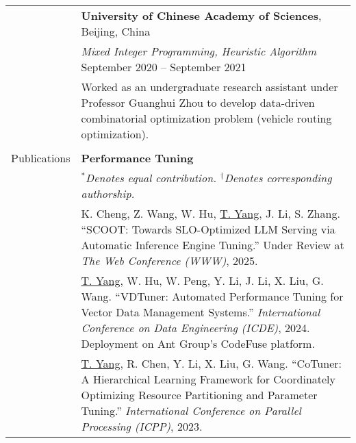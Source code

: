\documentclass[letterpaper, 10pt]{article}
\begin{document}
\begin{longtable}{p{}p{}}
& \textbf{University of Chinese Academy of Sciences}, Beijing, China \\ 
& \textit{Mixed Integer Programming, Heuristic Algorithm} \hfill September 2020 -- September 2021 \\
&  Worked as an undergraduate research assistant under Professor Guanghui Zhou to develop data-driven combinatorial optimization problem (vehicle routing optimization). \\
& \\




\nohyphens{\textcolor{OliveGreen}{Publications}} 
& \textbf{Performance Tuning} 
\vspace{0.01\textwidth} \\

& \textit{$^*$Denotes equal contribution. $^\dagger$Denotes corresponding authorship.} 
\vspace{0.01\textwidth} \\

& K. Cheng, Z. Wang, W. Hu, \underline{T. Yang}, J. Li, S. Zhang. \enquote{SCOOT: Towards SLO-Optimized LLM Serving via Automatic Inference Engine Tuning.} Under Review at  \textit{The Web Conference (WWW)}, 2025. 
\vspace{0.01\textwidth} \\

& \underline{T. Yang}, W. Hu, W. Peng, Y. Li, J. Li, X. Liu, G. Wang. \enquote{VDTuner: Automated Performance Tuning for Vector Data Management Systems.} \textit{International Conference on Data Engineering (ICDE)}, 2024. \textcolor[RGB]{200, 0, 0}{Deployment on Ant Group's CodeFuse platform.}
\vspace{0.01\textwidth} \\

& \underline{T. Yang}, R. Chen, Y. Li, X. Liu, G. Wang. \enquote{CoTuner: A Hierarchical Learning Framework for Coordinately Optimizing Resource Partitioning and Parameter Tuning.} \textit{International Conference on Parallel Processing (ICPP)}, 2023.
\vspace{0.01\textwidth} \\


\end{longtable}
\end{document}
